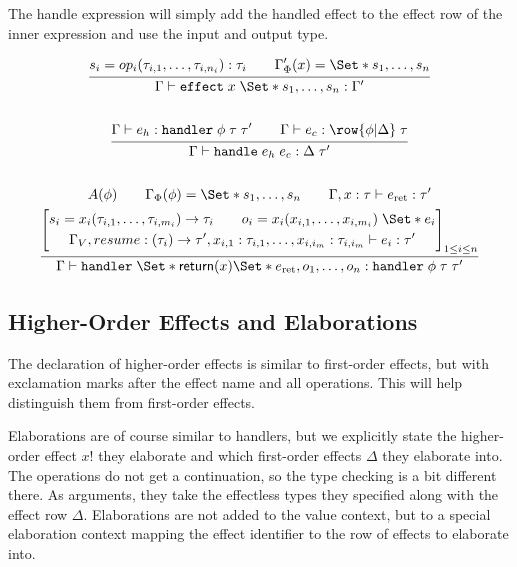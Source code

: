 The handle expression will simply add the handled effect to the effect row of the inner expression and use the input and output type.

\begin{gather*}
    \infer{
        \Gamma \vdash \kw{effect}\;x\;\S{s_1, \dots, s_n}: \Gamma'
    }{
        s_i = op_i(\tau_{i,1},\dots, \tau_{i,n_i}): \tau_i
        \qquad
        \Gamma'_\Phi(x) = \S{s_1, \dots, s_n}
    }
    \\\\
    \infer{
        \Gamma \vdash \handle\;e_h\;e_c : \Delta\;\tau'
    }{
        \Gamma \vdash e_h : \handler\;\phi\;\tau\;\tau'
        \qquad
        \Gamma \vdash e_c : \row{\phi | \Delta}\;\tau
    }
    \\\\
    \infer{
        \Gamma \vdash \handler\;\S{ \return(x) \S{ e_{\text{ret}} }, o_1, \dots, o_n }
        : \handler\;\phi\;\tau\;\tau'
    }{
        A(\phi)
        \qquad
        \Gamma_\Phi(\phi) = \S{ s_1, \dots, s_n }
        \qquad
        \Gamma, x: \tau \vdash e_{\text{ret}} : \tau' 
        \\
        \left[
            \begin{gathered}
                s_i = x_i(\tau_{i,1}, \dots, \tau_{i,m_i}) \to \tau_i
                \qquad
                o_i = x_i(x_{i,1}, \dots, x_{i,m_i})\;\S{ e_i }
                \\
                \Gamma_V, resume : (\tau_i) \to \tau', x_{i,1}: \tau_{i,1}, \dots, x_{i,i_m}: \tau_{i,i_m} 
                \vdash e_i: \tau'
            \end{gathered}
        \right]_{1\leq i\leq n}
    }
\end{gather*}

\subsection{Higher-Order Effects and Elaborations}

The declaration of higher-order effects is similar to first-order effects, but with exclamation marks after the effect name and all operations. This will help distinguish them from first-order effects.

Elaborations are of course similar to handlers, but we explicitly state the higher-order effect $x!$ they elaborate and which first-order effects $\Delta$ they elaborate into. The operations do not get a continuation, so the type checking is a bit different there. As arguments, they take the effectless types they specified along with the effect row $\Delta$. Elaborations are not added to the value context, but to a special elaboration context mapping the effect identifier to the row of effects to elaborate into.
\\

